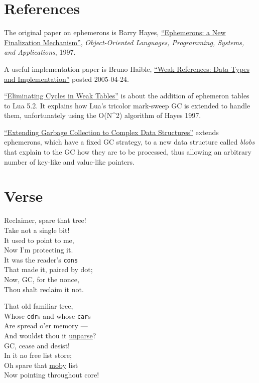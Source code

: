 \section{References}\label{references}

The original paper on ephemerons is Barry Hayes,
\href{https://static.aminer.org/pdf/PDF/000/522/273/ephemerons_a_new_finalization_mechanism.pdf}{``Ephemerons:
a New Finalization Mechanism''}, \emph{Object-Oriented Languages,
Programming, Systems, and Applications}, 1997.

A useful implementation paper is Bruno Haible,
\href{http://www.haible.de/bruno/papers/cs/weak/WeakDatastructures-writeup.html}{``Weak
References: Data Types and Implementation''} posted 2005-04-24.

\href{http://www.inf.puc-rio.br/~roberto/docs/ry08-06.pdf}{``Eliminating
Cycles in Weak Tables''} is about the addition of ephemeron tables to
Lua 5.2. It explains how Lua's tricolor mark-sweep GC is extended to
handle them, unfortunately using the O(N\^{}2) algorithm of Hayes 1997.

\href{https://www.cs.hmc.edu/~oneill/papers/Blobs-SPACE.pdf}{``Extending
Garbage Collection to Complex Data Structures''} extends ephemerons,
which have a fixed GC strategy, to a new data structure called
\emph{blobs} that explain to the GC how they are to be processed, thus
allowing an arbitrary number of key-like and value-like pointers.

\section{Verse}\label{verse}


Reclaimer, spare that tree!\\
Take not a single bit!\\
It used to point to me,\\
Now I'm protecting it.\\
It was the reader's \texttt{cons}\\
That made it, paired by dot;\\
Now, GC, for the nonce,\\
Thou shalt reclaim it not.

That old familiar tree,\\
Whose \texttt{cdr}s and whose \texttt{car}s\\
Are spread o'er memory ---\\
And wouldst thou it
\href{http://catb.org/jargon/html/P/parse.html}{unparse}?\\
GC, cease and desist!\\
In it no free list store;\\
Oh spare that \href{http://catb.org/jargon/html/M/moby.html}{moby}
list\\
Now pointing throughout core!

